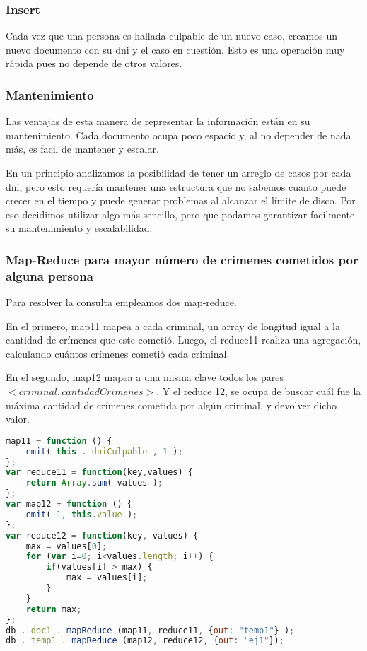 \documentclass[11pt, a4paper]{article}
\begin{document}
\subsubsection{Insert}

Cada vez que una persona es hallada culpable de un nuevo caso, creamos un nuevo documento con su dni y el caso en cuesti\'on. Esto es una operaci\'on muy r\'apida pues no depende de otros valores.

\subsubsection{Mantenimiento}

Las ventajas de esta manera de representar la informaci\'on est\'an en su mantenimiento. Cada documento ocupa poco espacio y, al no depender de nada m\'as, es facil de mantener y escalar. \

En un principio analizamos la posibilidad de tener un arreglo de casos por cada dni, pero esto requer\'ia mantener una estructura que no sabemos cuanto puede crecer en el tiempo y puede generar problemas al alcanzar el límite de disco. Por eso decidimos utilizar algo m\'as sencillo, pero que podamos garantizar facilmente su mantenimiento y escalabilidad.

\subsubsection{Map-Reduce para mayor número de crimenes cometidos por alguna persona}

Para resolver la consulta empleamos dos map-reduce. 

En el primero, map11 mapea a cada criminal, un array de longitud igual a la cantidad de crímenes que este cometió. Luego, el reduce11 realiza una agregación, calculando cuántos crímenes cometió cada criminal.

En el segundo, map12 mapea a una misma clave todos los pares $<criminal, cantidadCrimenes>$. Y el reduce 12, se ocupa de buscar cuál fue la máxima cantidad de crímenes cometida por algún criminal, y devolver dicho valor.

\begin{lstlisting}[language=JavaScript]
map11 = function () {
    emit( this . dniCulpable , 1 ); 
};
var reduce11 = function(key,values) {
    return Array.sum( values ); 
};
var map12 = function () {
    emit( 1, this.value );  
};
var reduce12 = function(key, values) {
    max = values[0];
    for (var i=0; i<values.length; i++) {
        if(values[i] > max) {
            max = values[i];
        }
    }
    return max;
};
db . doc1 . mapReduce (map11, reduce11, {out: "temp1"} );
db . temp1 . mapReduce (map12, reduce12, {out: "ej1"});
\end{lstlisting}
\end{document}
